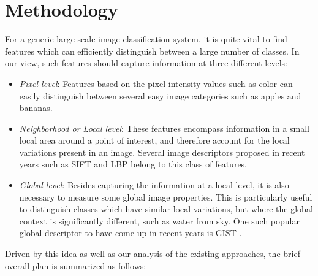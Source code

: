 \documentclass[12pt]{article}
\begin{document}
\section{Methodology}
For a generic large scale image classification system, it is quite vital to find features which can efficiently distinguish between a large number of classes. In our view, such features should capture information at three different levels:

\begin{itemize}
\item \textit{Pixel level}: Features based on the pixel intensity values such as color can easily distinguish between several easy image categories such as apples and bananas.

\item \textit{Neighborhood or Local level}: These features encompass information in a small local area around a point of interest, and therefore account for the local variations present in an image. Several image descriptors proposed in recent years such as SIFT \cite{lowe04} and LBP \cite{ahonen06} belong to this class of features.

\item \textit{Global level}: Besides capturing the information at a local level, it is also necessary to measure some global image properties. This is particularly useful to distinguish classes which have similar local variations, but where the global context is significantly different, such as water from sky. One such popular global descriptor to have come up in recent years is 
GIST \cite{oliva2001modeling}.
\end{itemize}

Driven by this idea as well as our analysis of the existing approaches, the brief overall plan is summarized as follows: 
\end{document}
